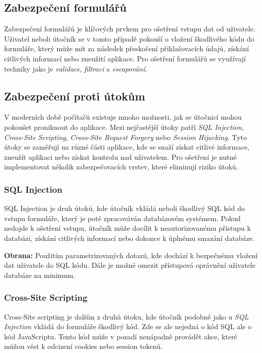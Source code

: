 \subsection{Zabezpečení formulářů}
\label{subsec:security-forms}
Zabezpečení formulářů je klíčových prvkem pro ošetření vstupu dat od uživatele. Uživatel neboli útočník se v tomto případě pokouší o vložení škodlivého kódu do formuláře, který může mít za následek přeskočení přihlašovacích údajů, získání citlivých informací nebo zneužití aplikace. Pro ošetření formulářů se využívají techniky jako je \textit{validace}, \textit{filtraci} a \textit{escapování}.

\subsection{Zabezpečení proti útokům}
\label{subsec:security-attacks}
V moderních době počítačů existuje mnoho možnosti, jak se útočnicí mohou pokoušet proniknout do aplikace. Mezi nejčastější útoky patří \textit{SQL Injection}, \textit{Cross-Site Scripting}, \textit{Cross-Site Request Forgery} nebo \textit{Session Hijacking}. Tyto útoky se zaměřují na různé části aplikace, kde se snaží získat citlivé informace, zneužít aplikaci nebo získat kontrolu nad uživatelem. Pro ošetření je nutné implementovat několik zabezpečovacích vrstev, které eliminují riziko útoků.

\subsubsection*{SQL Injection}
\label{subsubsec:security-attacks-sql-injection}
SQL Injection je druh útoků, kde ůtočník vkládá neboli  škodlivý SQL kód do vstupu formuláře, který je poté zpracováván databázovém systémem. Pokud nedojde k ošetření vstupu, útočník může docílit k neautorizovanému přístupu k databázi, získání citlivých informací nebo dokonce k úplnému smazání databáze.

\textbf{Obrana:} Použitím parametrizovaných dotazů, kde dochází k bezpečnému vložení dat uživatele do SQL kódu. Dále je možné omezit přístupová oprávnění uživatele databáze na minimum.

\subsubsection*{Cross-Site Scripting}
\label{subsubsec:security-attacks-cross-site-scripting}
Cross-Site scripting je dalším z druhů útoku, kde útočník podobně jako u \textit{SQL Injection} vkládá do formuláře škodlivý kód. Zde se ale nejedná o kód SQL ale o kód JavaScriptu. Tento kód může v pozadí nenápadně provádět akce, které můžou vést k odcizení cookies nebo session tokenů.

